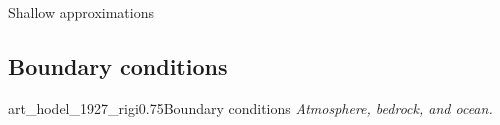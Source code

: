 
    \begin{frame}{Shallow approximations}
      \centering
      
    \end{frame}


\subsection{Boundary conditions}

    \begin{sectionframe}{art_hodel_1927_rigi}{0.75}{Boundary conditions}
      \emph{Atmosphere, bedrock, and ocean.}
    \end{sectionframe}

